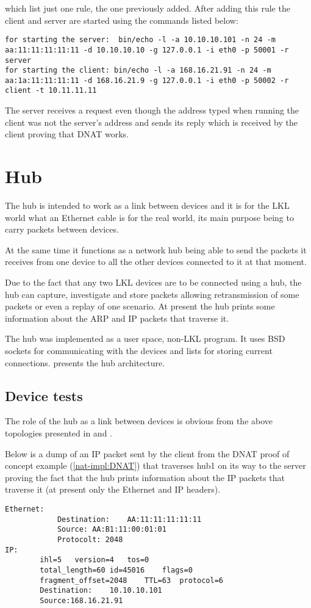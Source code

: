 {{\begin{itemize}
which list just one rule, the one previously added. 
After adding this rule the client and server are started using the commands listed below:
\lstset{language=TeX, caption=SNAT-starting client and server applications}
\begin{lstlisting}
for starting the server:  bin/echo -l -a 10.10.10.101 -n 24 -m aa:11:11:11:11:11 -d 10.10.10.10 -g 127.0.0.1 -i eth0 -p 50001 -r server
for starting the client: bin/echo -l -a 168.16.21.91 -n 24 -m aa:1a:11:11:11:11 -d 168.16.21.9 -g 127.0.0.1 -i eth0 -p 50002 -r client -t 10.11.11.11
\end{lstlisting}
 The server receives a request even though the address typed when running the client was not the server's address and sends its reply which is received by the client proving that DNAT works.
\end{itemize}
\section{Hub}
\label{sec:hub:impl}

The hub is intended to work as a link between devices and it is for the LKL world what an Ethernet 
cable is for the real world, its main purpose being to carry packets between devices.

At the same time it functions as a network hub being able to send the packets it receives from one 
device to all the other devices connected to it at that moment.

Due to the fact that any two LKL devices are to be connected using a hub, the hub can capture, 
investigate and store packets allowing retransmission of some packets or even a replay of one scenario. 
At present the hub prints some information about the ARP and IP packets that traverse it. 

The hub was implemented as a user space, non-LKL program. It uses BSD sockets for communicating with the 
devices and lists for storing current connections.
 presents the hub architecture. 
\subsection{Device tests}
\label{sub-sec:router-tests}
The role of the hub as a link between devices is obvious from the above topologies presented in 
 and .

Below is a dump of an IP packet sent by the client from the DNAT proof of concept example
(\ref{nat-impl:DNAT}) that traverses hub1 on its way to the server proving the fact that 
the hub prints information about the IP packets that traverse it (at present only the Ethernet and IP headers).
\pagebreak[4]
\lstset{language=TeX, caption=Hub-print packet information}
\begin{lstlisting}
Ethernet:
			Destination:	AA:11:11:11:11:11
			Source:	AA:B1:11:00:01:01
			Protocolt: 2048
IP:
		ihl=5	version=4	tos=0
		total_length=60	id=45016	flags=0
		fragment_offset=2048	TTL=63	protocol=6
		Destination:	10.10.10.101
		Source:168.16.21.91
\end{lstlisting}
 

}}
